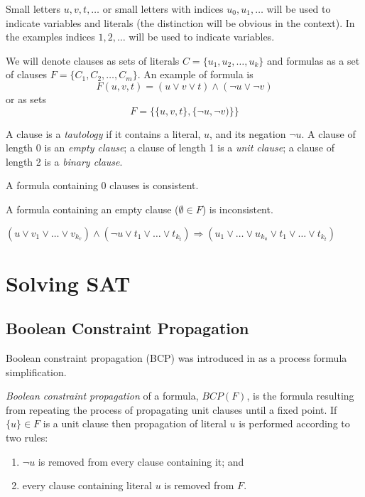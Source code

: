 Small letters $u, v, t, \ldots$ or small letters with indices $u_0,
u_1, \ldots$ will be used to indicate variables and literals (the
distinction will be obvious in the context). In the examples
indices $1, 2, \ldots$ will be used to indicate variables.

We will denote clauses as sets of literals $C = \{ u_1, u_2, \ldots,
u_k \}$ and formulas as a set of clauses $F = \{ C_1, C_2, \ldots,
C_m \} $.  An example of formula is
\[
F(u, v, t) = (u \lor v \lor t) \land (\neg u \lor \neg v)
\]
or as sets
\[
F = \{ \{u, v, t\}, \{\neg u, \neg v)\}\}
\]

\begin{mydef}
  A clause is a \emph{tautology} if it contains a literal, $u$, and its negation
  $\neg u$. A clause of length 0 is an \emph{empty clause}; a clause of length 1
  is a \emph{unit clause}; a clause of length 2 is a \emph{binary clause}. 
\end{mydef}

\begin{myprop}
  A formula containing 0 clauses is consistent.
\end{myprop}

\begin{myprop}
  A formula containing an empty clause ($\emptyset \in F$) is inconsistent.
\end{myprop}

\begin{mydef}[Resolution]
  \label{mydef:resolution}
  $(u \lor v_1 \lor \ldots \lor v_{k_v})
  \land (\neg u \lor t_1 \lor \ldots \lor t_{k_t})
  \Rightarrow (u_1 \lor \ldots \lor u_{k_u} \lor t_1 \lor \ldots \lor t_{k_t})$
\end{mydef}




\section{Solving SAT}

\subsection{Boolean Constraint Propagation}
\label{ssec:bcp}

Boolean constraint propagation (BCP) was introduced in
\cite{Davis:1960:CPQ:321033.321034} as a process formula
simplification.

\begin{mydef}
  \emph{Boolean constraint propagation} of a formula, $BCP(F)$, is
  the formula resulting from repeating the process of propagating
  unit clauses until a fixed point. If $\{ u \} \in F$ is a unit
  clause then propagation of literal
  $u$ is performed according to two rules:
  \begin{enumerate}
    \item $\neg u$ is removed from every clause containing it; and
    \item every clause containing literal $u$ is removed from $F$.
  \end{enumerate}
\end{mydef}

